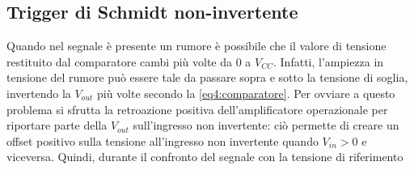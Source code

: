 \subsection{Trigger di Schmidt non-invertente}

Quando nel segnale è presente un rumore è possibile che il valore di tensione restituito dal comparatore cambi più volte da $0$ a $V_{CC}$. Infatti, l'ampiezza in tensione del rumore può essere tale da passare sopra e sotto la tensione di soglia, invertendo la $V_{out}$ più volte secondo la \ref{eq4:comparatore}. Per ovviare a questo problema si sfrutta la retroazione positiva dell'amplificatore operazionale per riportare parte della $V_{out}$ sull'ingresso non invertente: ciò permette di creare un offset positivo sulla tensione all'ingresso non invertente quando $V_{in}>0$ e viceversa. Quindi, durante il confronto del segnale con la tensione di riferimento